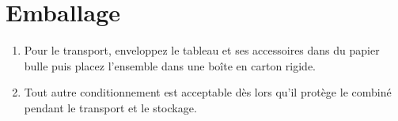 \chapter{Emballage}\label{ch:package}

\begin{enumerate}
    \item Pour le transport, enveloppez le tableau et ses accessoires dans du papier bulle puis placez l'ensemble dans une boîte en carton rigide.
    \item Tout autre conditionnement est acceptable dès lors qu'il protège le combiné pendant le transport et le stockage.
\end{enumerate}
